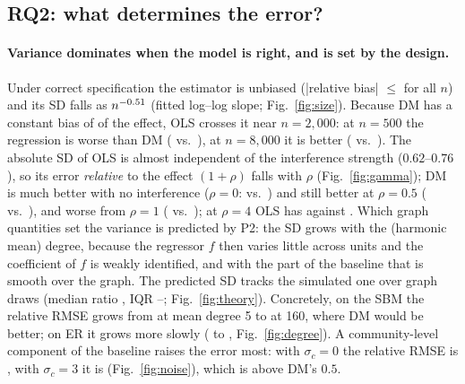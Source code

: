 \begin{table}[t]
\centering\small
\caption{Main grid, median over six graphs [min, max] of relative RMSE of DM and of OLS$(z,f)$, median relative bias of OLS$(z,f)$, and the number of graphs on which OLS$(z,f)$ is better than / worse than / not significantly different from DM in paired MSE (95\% bootstrap CI of the MSE ratio, \texttt{results/contrasts.csv}).}
\label{tab:failure}

\end{table}

\subsection{RQ2: what determines the error?}
\paragraph{Variance dominates when the model is right, and is set by the design.}
Under correct specification the estimator is unbiased (|relative bias| $\le$ \EoneBiasMax{} for all $n$) and its SD falls as $n^{-0.51}$ (fitted log--log slope; Fig.~\ref{fig:size}). Because DM has a constant bias of \EoneDMbias{} of the effect, OLS crosses it near $n=2{,}000$: at $n=500$ the regression is worse than DM (\EoneOLSA{} vs.\ \EoneDMA), at $n=8{,}000$ it is better (\EoneOLSC{} vs.\ \EoneDMC). The absolute SD of OLS is almost independent of the interference strength ($0.62$--$0.76$), so its error \emph{relative} to the effect $(1+\rho)$ falls with $\rho$ (Fig.~\ref{fig:gamma}); DM is much better with no interference ($\rho=0$: \EthreeDMZ{} vs.\ \EthreeOLSZ) and still better at $\rho=0.5$ (\EthreeDMH{} vs.\ \EthreeOLSH), and worse from $\rho=1$ (\EthreeDMO{} vs.\ \EthreeOLSO); at $\rho=4$ OLS has \EthreeOLSF{} against \EthreeDMF. Which graph quantities set the variance is predicted by P2: the SD grows with the (harmonic mean) degree, because the regressor $f$ then varies little across units and the coefficient of $f$ is weakly identified, and with the part of the baseline that is smooth over the graph. The predicted SD tracks the simulated one over \TheoryVarN{} graph draws (median ratio \TheoryVarMed, IQR \TheoryVarLo--\TheoryVarHi; Fig.~\ref{fig:theory}). Concretely, on the SBM the relative RMSE grows from \EtwoSbmLo{} at mean degree 5 to \EtwoSbmHi{} at 160, where DM would be better; on ER it grows more slowly (\EtwoErLo{} to \EtwoErHi, Fig.~\ref{fig:degree}). A community-level component of the baseline raises the error most: with $\sigma_c=0$ the relative RMSE is \EnineCzero{}, with $\sigma_c=3$ it is \EnineCthree{} (Fig.~\ref{fig:noise}), which is above DM's $0.5$.

